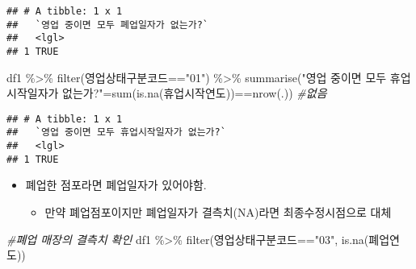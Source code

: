\documentclass[
]{book}
\newenvironment{Shaded}{\begin{snugshade}}{\end{snugshade}}
\newcommand{\CommentTok}[1]{\textcolor[rgb]{0.56,0.35,0.01}{\textit{#1}}}
\newcommand{\FunctionTok}[1]{\textcolor[rgb]{0.00,0.00,0.00}{#1}}
\newcommand{\NormalTok}[1]{#1}
\newcommand{\OtherTok}[1]{\textcolor[rgb]{0.56,0.35,0.01}{#1}}
\newcommand{\SpecialCharTok}[1]{\textcolor[rgb]{0.00,0.00,0.00}{#1}}
\newcommand{\StringTok}[1]{\textcolor[rgb]{0.31,0.60,0.02}{#1}}
\providecommand{\tightlist}{%
  \setlength{\itemsep}{0pt}\setlength{\parskip}{0pt}}
\begin{document}
\begin{verbatim}
## # A tibble: 1 x 1
##   `영업 중이면 모두 폐업일자가 없는가?`
##   <lgl>                                
## 1 TRUE
\end{verbatim}

\begin{Shaded}
\begin{Highlighting}[]
\NormalTok{df1 }\SpecialCharTok{\%\textgreater{}\%} 
  \FunctionTok{filter}\NormalTok{(영업상태구분코드}\SpecialCharTok{==}\StringTok{"01"}\NormalTok{) }\SpecialCharTok{\%\textgreater{}\%}
  \FunctionTok{summarise}\NormalTok{(}\StringTok{"영업 중이면 모두 휴업시작일자가 없는가?"}\OtherTok{=}\FunctionTok{sum}\NormalTok{(}\FunctionTok{is.na}\NormalTok{(휴업시작연도))}\SpecialCharTok{==}\FunctionTok{nrow}\NormalTok{(.)) }\CommentTok{\#없음}
\end{Highlighting}
\end{Shaded}

\begin{verbatim}
## # A tibble: 1 x 1
##   `영업 중이면 모두 휴업시작일자가 없는가?`
##   <lgl>                                    
## 1 TRUE
\end{verbatim}

\begin{itemize}
\item
  폐업한 점포라면 폐업일자가 있어야함.

  \begin{itemize}
  \tightlist
  \item
    만약 폐업점포이지만 폐업일자가 결측치(NA)라면 최종수정시점으로 대체
  \end{itemize}
\end{itemize}

\begin{Shaded}
\begin{Highlighting}[]
\CommentTok{\#폐업 매장의 결측치 확인}
\NormalTok{df1 }\SpecialCharTok{\%\textgreater{}\%}
  \FunctionTok{filter}\NormalTok{(영업상태구분코드}\SpecialCharTok{==}\StringTok{"03"}\NormalTok{, }\FunctionTok{is.na}\NormalTok{(폐업연도))}
\end{Highlighting}
\end{Shaded}
\end{document}
